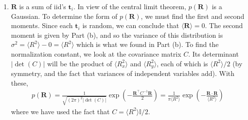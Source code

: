 \documentclass{article}
\theoremstyle{definition}
\newcommand{\f}[2]{\frac{#1}{#2}}
\newcommand{\lp}{\left(}
\newcommand{\rp}{\right)}
\begin{document}
\begin{enumerate}[label=(\alph*)]
	
	\item $\mathbf{R}$ is a sum of iid's $\mathbf{t}_i$. In view of the central limit theorem, $p(\mathbf{R})$ is a Gaussian. To determine the form of $p(\mathbf{R})$, we must find the first and second moments. Since each $\mathbf{t}_i$ is  random, we can conclude that $\langle \mathbf{R} \rangle = 0$. The second moment is given by Part (b), and so the variance of this distribution is $\sigma^2 = \langle R^2 \rangle - 0 = \langle R^2 \rangle $ which is what we found in Part (b). To find the normalization constant, we look at the covariance matrix $C$. Its determinant $|\det(C)|$ will be the product of $\langle R_x^2\rangle$ and $\langle R_y^2 \rangle$, each of which is $\langle R^2 \rangle /2$ (by symmetry, and the fact that variances of independent variables add). With these, 
	\begin{align*}
	p(\mathbf{R}) = \f{1}{\sqrt{(2\pi)^2 |\det(C)|}} \exp \lp -\f{\mathbf{R}^\top C^{-1} \mathbf{R}}{ 2} \rp = \boxed{\f{1}{\pi \langle R^2 \rangle} \exp\lp -\f{\mathbf{R}\cdot \mathbf{R}}{\langle R^2 \rangle} \rp}
	\end{align*}
	where we have used the fact that $C = \langle R^2 \rangle\mathbb{I}/2$. 
	

\end{enumerate}
\end{document}
